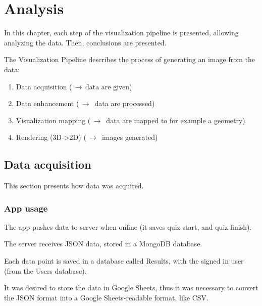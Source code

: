 \chapter{Analysis}



In this chapter, each step of the visualization pipeline is presented, allowing analyzing the data. Then, conclusions are presented.

The Visualization Pipeline describes the process of generating an image from the data: \cite{timo-ropinski-liu}

\begin{enumerate}
\item Data acquisition ($\,\to\,$data are given)
\item Data enhancement ($\,\to\,$ data are processed)
\item Visualization mapping ($\,\to\,$ data are mapped to for example a geometry)
\item Rendering (3D->2D) ($\,\to\,$ images generated)
\end{enumerate}


\section{Data acquisition}

This section presents how data was acquired.

\subsection{App usage}
The app pushes data to server when online (it saves quiz start, and quiz finish).

The server receives JSON data, stored in a MongoDB database.

Each data point is saved in a database called Results, with the signed in user (from the Users database).

It was desired to store the data in Google Sheets, thus it was necessary to convert the JSON format into a Google Sheets-readable format, like CSV.

